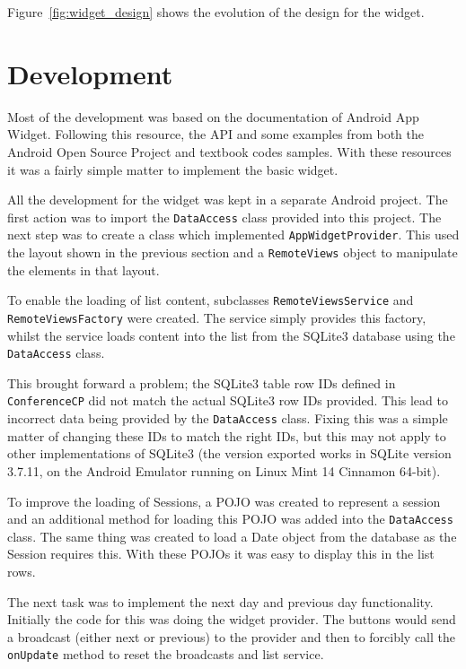 \documentclass[11pt, a4paper]{article}
\begin{document}
Figure~\ref{fig:widget_design} shows the evolution of the design for the 
widget.


\section{Development}

Most of the development was based on the documentation of Android App 
Widget\cite{google2013appwidgets}. Following this resource, the API and some 
examples from both the Android Open Source Project and textbook codes 
samples\cite{murphy2009android}. With these resources it was a fairly simple 
matter to implement the basic widget.

All the development for the widget was kept in a separate Android project. The
first action was to import the \texttt{DataAccess} class provided into this 
project. The next step was to create a class which implemented 
\texttt{AppWidgetProvider}. This used the layout shown in the previous section
and a \texttt{RemoteViews} object to manipulate the elements in that layout.

To enable the loading of list content, subclasses \texttt{RemoteViewsService} 
and \texttt{RemoteViewsFactory} were created. The service simply provides this 
factory, whilst the service loads content into the list from the SQLite3 
database using the \texttt{DataAccess} class.

This brought forward a problem; the SQLite3 table row IDs defined in
\texttt{ConferenceCP} did not match the actual SQLite3 row IDs provided. This
lead to incorrect data being provided by the \texttt{DataAccess} class. Fixing
this was a simple matter of changing these IDs to match the right IDs, but this
may not apply to other implementations of SQLite3 (the version exported works
in SQLite version 3.7.11, on the Android Emulator running on Linux Mint 14 
Cinnamon 64-bit).

To improve the loading of Sessions, a POJO\cite{fowler2000pojo} was created to
represent a session and an additional method for loading this POJO was added 
into the \texttt{DataAccess} class. The same thing was created to load a Date
object from the database as the Session requires this. With these POJOs it was
easy to display this in the list rows.

The next task was to implement the next day and previous day functionality. 
Initially the code for this was doing the widget provider. The buttons would 
send a broadcast (either next or previous) to the provider and then to forcibly
call the \texttt{onUpdate} method to reset the broadcasts and list service.
\end{document}
